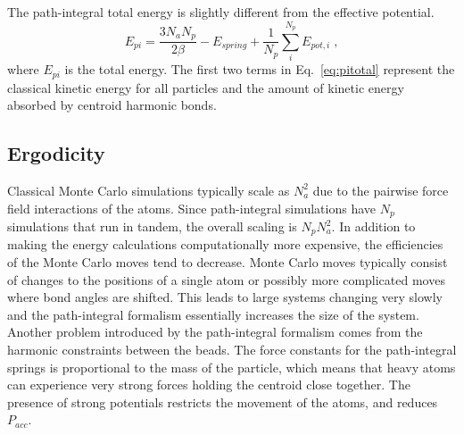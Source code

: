 \documentclass[12pt]{report}
\begin{document}
The path-integral total energy is slightly different from the effective
potential.
\begin{equation}
 \label{eq:pitotal}
 E_{pi} = \frac{3N_aN_p}{2\beta}-E_{spring}
          +\frac{1}{N_p}\sum_i^{N_p} E_{pot,i} \; ,
\end{equation}
where $E_{pi}$ is the total energy. The first two terms in Eq.\
\ref{eq:pitotal} represent the classical kinetic energy for all particles and
the amount of kinetic energy absorbed by centroid harmonic bonds.

\subsection{Ergodicity}

Classical Monte Carlo simulations typically scale as $N_a^2$ due to the
pairwise force field interactions of the atoms. Since path-integral
simulations have $N_p$ simulations that run in tandem, the overall scaling is
$N_pN_a^2$. In addition to making the energy calculations computationally more
expensive, the efficiencies of the Monte Carlo moves tend to decrease. Monte
Carlo moves typically consist of changes to the positions of a single atom or
possibly more complicated moves where bond angles are shifted. This leads to
large systems changing very slowly and the path-integral formalism essentially
increases the size of the system. \\

Another problem introduced by the path-integral formalism comes from the
harmonic constraints between the beads. The force constants for the
path-integral springs is proportional to the mass of the particle, which means
that heavy atoms can experience very strong forces holding the centroid
close together. The presence of strong potentials restricts the movement of
the atoms, and reduces $P_{acc}$.

\FloatBarrier
\end{document}
